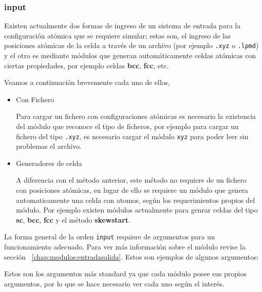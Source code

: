 \subsubsection{input}

Existen actualmente dos formas de ingreso de un sistema de entrada para la configuraci\'on at\'omica que se requiere simular; estas son, el ingreso de las posiciones at\'omicas de la celda a trav\'es de un archivo (por ejemplo \verb|.xyz| o \verb|.lpmd|) y el otro es mediante m\'odulos que generan autom\'aticamente celdas at\'omicas con ciertas propiedades, por ejemplo celdas \textbf{bcc}, \textbf{fcc}, etc.

Veamos a continuaci\'on brevemente cada uno de ellos,

\begin{itemize}
 \item{Con Fichero}

Para cargar un fichero con configuraciones at\'omicas es necesario la existencia del m\'odulo que reconoce el tipo de ficheros, por ejemplo para cargar un fichero del tipo \verb|.xyz|, es necesario cargar el m\'odulo \verb|xyz| para poder leer sin problemas el archivo. 
  \item{Generadores de celda}

A diferencia con el m\'etodo anterior, este m\'etodo no requiere de un fichero con posiciones at\'omicas, en lugar de ello se requiere un m\'odulo que genera automaticamente una celda con atomos, seg\'un los requerimientos propios del m\'odulo. Por ejemplo existen m\'odulos actualmente para genrar celdas del tipo \textbf{sc}, \textbf{bcc}, \textbf{fcc} y el m\'etodo \textbf{skewstart}.

\end{itemize}

La forma general de la orden \verb|input| requiere de argumentos para un funcionamiento adecuado. Para ver m\'as informaci\'on sobre el m\'odulo revise la secci\'on ~\ref{chap:modulos:entradasalida}. Estos son ejemplos de algunos argumentos:


Estos son los argumentos m\'as standard ya que cada m\'odulo posee sus propios argumentos, por lo que se hace necesario ver cada uno seg\'un el inter\'es.

